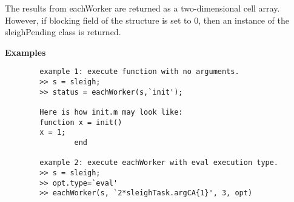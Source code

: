 \begin{list}{}{}
    The results from eachWorker are returned as a two-dimensional cell array.
    However, if blocking field of the structure is set to 0, then an instance of the sleighPending class is returned.
    
	\item {\bf Examples}
		\begin{verbatim}
		example 1: execute function with no arguments.
		>> s = sleigh;
		>> status = eachWorker(s,`init');

		Here is how init.m may look like: 
		function x = init()
		x = 1;
                end

		example 2: execute eachWorker with eval execution type.
		>> s = sleigh;
		>> opt.type=`eval'
		>> eachWorker(s, `2*sleighTask.argCA{1}', 3, opt)	
		\end{verbatim}
\end{list}

